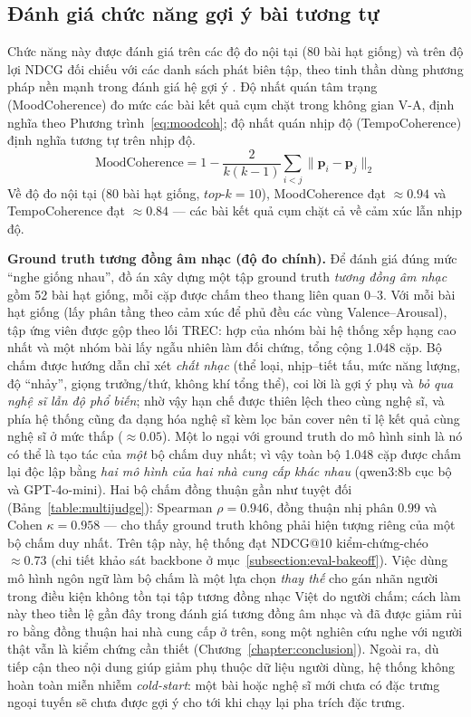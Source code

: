 \documentclass[../DoAn.tex]{subfiles}
\begin{document}
\subsection{Đánh giá chức năng gợi ý bài tương tự}
\label{subsection:eval-similar}
Chức năng này được đánh giá trên các độ đo nội tại (80 bài hạt giống) và trên độ lợi NDCG \cite{steck2018calibrated} đối chiếu với các danh sách phát biên tập, theo tinh thần dùng phương pháp nền mạnh trong đánh giá hệ gợi ý \cite{dacrema2019progress}. Độ nhất quán tâm trạng (MoodCoherence) đo mức các bài kết quả cụm chặt trong không gian V-A, định nghĩa theo Phương trình~\eqref{eq:moodcoh}; độ nhất quán nhịp độ (TempoCoherence) định nghĩa tương tự trên nhịp độ.
\begin{equation}\label{eq:moodcoh}
    \text{MoodCoherence} = 1 - \frac{2}{k(k-1)}\sum_{i<j} \big\lVert \mathbf{p}_i - \mathbf{p}_j \big\rVert_2
\end{equation}
Về độ đo nội tại (80 bài hạt giống, $top\text{-}k=10$), MoodCoherence đạt $\approx 0.94$ và TempoCoherence đạt $\approx 0.84$ --- các bài kết quả cụm chặt cả về cảm xúc lẫn nhịp độ.

\textbf{Ground truth tương đồng âm nhạc (độ đo chính).} Để đánh giá đúng mức ``nghe giống nhau'', đồ án xây dựng một tập ground truth \textit{tương đồng âm nhạc} gồm 52 bài hạt giống, mỗi cặp được chấm theo thang liên quan $0$--$3$. Với mỗi bài hạt giống (lấy phân tầng theo cảm xúc để phủ đều các vùng Valence--Arousal), tập ứng viên được gộp theo lối TREC: hợp của nhóm bài hệ thống xếp hạng cao nhất và một nhóm bài lấy ngẫu nhiên làm đối chứng, tổng cộng $1.048$ cặp. Bộ chấm được hướng dẫn chỉ xét \textit{chất nhạc} (thể loại, nhịp--tiết tấu, mức năng lượng, độ ``nhảy'', giọng trưởng/thứ, không khí tổng thể), coi lời là gợi ý phụ và \textit{bỏ qua nghệ sĩ lẫn độ phổ biến}; nhờ vậy hạn chế được thiên lệch theo cùng nghệ sĩ, và phía hệ thống cũng đa dạng hóa nghệ sĩ kèm lọc bản cover nên tỉ lệ kết quả cùng nghệ sĩ ở mức thấp ($\approx 0.05$). Một lo ngại với ground truth do mô hình sinh là nó có thể là tạo tác của \textit{một} bộ chấm duy nhất; vì vậy toàn bộ 1.048 cặp được chấm lại độc lập bằng \textit{hai mô hình của hai nhà cung cấp khác nhau} (qwen3:8b cục bộ và GPT-4o-mini). Hai bộ chấm đồng thuận gần như tuyệt đối (Bảng~\ref{table:multijudge}): Spearman $\rho = 0.946$, đồng thuận nhị phân $0.99$ và Cohen $\kappa = 0.958$ --- cho thấy ground truth không phải hiện tượng riêng của một bộ chấm duy nhất. Trên tập này, hệ thống đạt NDCG@10 kiểm-chứng-chéo $\approx 0.73$ (chi tiết khảo sát backbone ở mục~\ref{subsection:eval-bakeoff}). Việc dùng mô hình ngôn ngữ làm bộ chấm là một lựa chọn \textit{thay thế} cho gán nhãn người trong điều kiện không tồn tại tập tương đồng nhạc Việt do người chấm; cách làm này theo tiền lệ gần đây trong đánh giá tương đồng âm nhạc và đã được giảm rủi ro bằng đồng thuận hai nhà cung cấp ở trên, song một nghiên cứu nghe với người thật vẫn là kiểm chứng cần thiết (Chương~\ref{chapter:conclusion}). Ngoài ra, dù tiếp cận theo nội dung giúp giảm phụ thuộc dữ liệu người dùng, hệ thống không hoàn toàn miễn nhiễm \textit{cold-start}: một bài hoặc nghệ sĩ mới chưa có đặc trưng ngoại tuyến sẽ chưa được gợi ý cho tới khi chạy lại pha trích đặc trưng.
\end{document}
